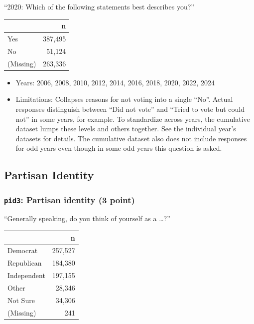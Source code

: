 \documentclass[10pt,article,oneside]{memoir}
\begin{document}
``2020: Which of the following statements best describes you?''

\begin{table}[H]
\centering
\begin{tabular}[t]{lr}
\toprule
 & n\\
\midrule
Yes & 387,495\\
No & 51,124\\
(Missing) & 263,336\\
\bottomrule
\end{tabular}
\end{table}

\begin{itemize}
\tightlist
\item
  Years: 2006, 2008, 2010, 2012, 2014, 2016, 2018, 2020, 2022, 2024
\item
  Limitations: Collapses reasons for not voting into a single ``No''.
  Actual responses distinguish between ``Did not vote'' and ``Tried to
  vote but could not'' in some years, for example. To standardize across
  years, the cumulative dataset lumps these levels and others together.
  See the individual year's datasets for details. The cumulative dataset
  also does not include responses for odd years even though in some odd
  years this question is asked.
\end{itemize}

\subsection{Partisan Identity}\label{partisan-identity}

\subsubsection{\texorpdfstring{\texttt{pid3}: Partisan identity (3
point)}{pid3: Partisan identity (3 point)}}\label{pid3-partisan-identity-3-point}

``Generally speaking, do you think of yourself as a \ldots?''

\begin{table}[H]
\centering
\begin{tabular}[t]{lr}
\toprule
 & n\\
\midrule
Democrat & 257,527\\
Republican & 184,380\\
Independent & 197,155\\
Other & 28,346\\
Not Sure & 34,306\\
(Missing) & 241\\
\bottomrule
\end{tabular}
\end{table}
\end{document}
